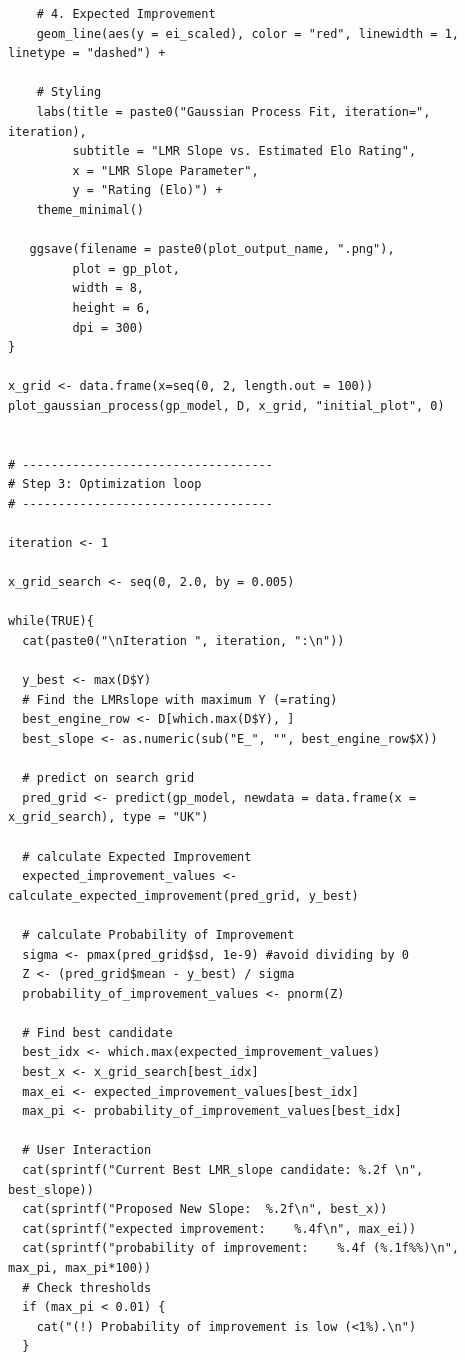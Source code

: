 \documentclass{article}
\begin{document}
\begin{verbatim}
    # 4. Expected Improvement
    geom_line(aes(y = ei_scaled), color = "red", linewidth = 1, linetype = "dashed") +
    
    # Styling
    labs(title = paste0("Gaussian Process Fit, iteration=", iteration),
         subtitle = "LMR Slope vs. Estimated Elo Rating",
         x = "LMR Slope Parameter",
         y = "Rating (Elo)") +
    theme_minimal()
  
   ggsave(filename = paste0(plot_output_name, ".png"), 
         plot = gp_plot, 
         width = 8, 
         height = 6, 
         dpi = 300)
}

x_grid <- data.frame(x=seq(0, 2, length.out = 100))
plot_gaussian_process(gp_model, D, x_grid, "initial_plot", 0)


# -----------------------------------
# Step 3: Optimization loop
# -----------------------------------

iteration <- 1

x_grid_search <- seq(0, 2.0, by = 0.005)

while(TRUE){
  cat(paste0("\nIteration ", iteration, ":\n"))
  
  y_best <- max(D$Y)
  # Find the LMRslope with maximum Y (=rating)
  best_engine_row <- D[which.max(D$Y), ]
  best_slope <- as.numeric(sub("E_", "", best_engine_row$X))
  
  # predict on search grid
  pred_grid <- predict(gp_model, newdata = data.frame(x = x_grid_search), type = "UK")
  
  # calculate Expected Improvement
  expected_improvement_values <- calculate_expected_improvement(pred_grid, y_best)
  
  # calculate Probability of Improvement
  sigma <- pmax(pred_grid$sd, 1e-9) #avoid dividing by 0
  Z <- (pred_grid$mean - y_best) / sigma
  probability_of_improvement_values <- pnorm(Z)

  # Find best candidate
  best_idx <- which.max(expected_improvement_values)
  best_x <- x_grid_search[best_idx]
  max_ei <- expected_improvement_values[best_idx]
  max_pi <- probability_of_improvement_values[best_idx]
  
  # User Interaction
  cat(sprintf("Current Best LMR_slope candidate: %.2f \n", best_slope))
  cat(sprintf("Proposed New Slope:  %.2f\n", best_x))
  cat(sprintf("expected improvement:    %.4f\n", max_ei))
  cat(sprintf("probability of improvement:    %.4f (%.1f%%)\n", max_pi, max_pi*100))
  # Check thresholds
  if (max_pi < 0.01) {
    cat("(!) Probability of improvement is low (<1%).\n")
  }
  

\end{verbatim}
\end{document}
